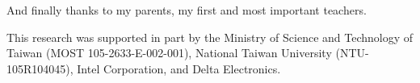 \begin{acknowledgementsen}
And finally thanks to my parents, my first and most important teachers.
  
\vspace{2cm} 

This research was supported in part by the Ministry of Science and Technology of Taiwan (MOST 105-2633-E-002-001), National Taiwan University (NTU-105R104045), Intel Corporation, and Delta Electronics.
\end{acknowledgementsen}

